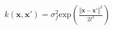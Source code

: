 \documentclass[10pt]{article}
\begin{document}
\begin{align*}k(\mathbf{x}, \mathbf{x}') = \sigma^2_f \text{exp}\left(\frac{\left\Vert \mathbf{x}-\mathbf{x}' \right\Vert^2}{2l^2}\right)\end{align*}
\end{document}
